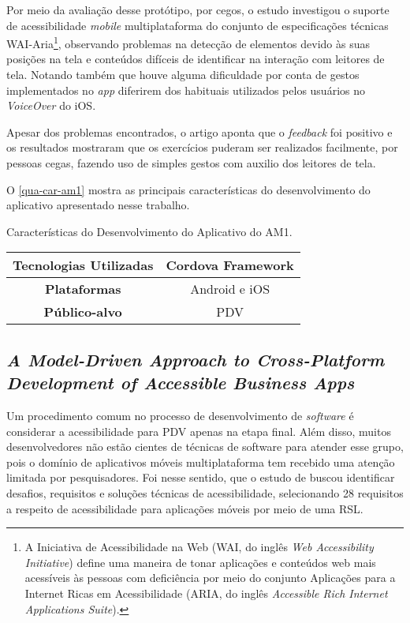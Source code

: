 Por meio da avaliação desse protótipo, por cegos, o estudo investigou o suporte de acessibilidade \emph{mobile} multiplataforma do conjunto de especificações
técnicas WAI-Aria\footnote{A Iniciativa de Acessibilidade na Web (WAI, do inglês \emph{Web Accessibility Initiative})
  define uma maneira de tonar aplicações e conteúdos web mais acessíveis às pessoas com deficiência por meio do conjunto
  Aplicações para a Internet Ricas em Acessibilidade (ARIA, do inglês \emph{Accessible Rich Internet Applications Suite}).},
observando problemas na detecção de elementos devido às suas posições na tela e conteúdos difíceis
de identificar na interação com leitores de tela. Notando também que houve alguma dificuldade por
conta de gestos implementados no \emph{app} diferirem dos habituais utilizados pelos usuários no \emph{VoiceOver} do iOS.

Apesar dos problemas encontrados, o artigo aponta que o \emph{feedback} foi positivo e os resultados mostraram que os exercícios puderam ser realizados facilmente, por pessoas cegas,
fazendo uso de simples gestos com auxilio dos leitores de tela.

O \autoref{qua-car-am1} mostra as principais características do desenvolvimento do aplicativo apresentado nesse trabalho.

\begin{quadro}[htb!]
  \caption{\label{qua-car-am1}Características do Desenvolvimento do Aplicativo do AM1.}
  \begin{tabular}{|c|c|}
    \hline
    \textbf{Tecnologias Utilizadas} & Cordova Framework \\ \hline
    \textbf{Plataformas}            & Android e iOS     \\ \hline
    \textbf{Público-alvo}           & PDV               \\
    \hline
  \end{tabular}
\end{quadro}

\subsection{\emph{A Model-Driven Approach to Cross-Platform Development of Accessible Business Apps}}

Um procedimento comum no processo de desenvolvimento de \emph{software} é considerar a acessibilidade para PDV apenas na etapa final.
Além disso, muitos desenvolvedores não estão cientes de técnicas de software para atender esse grupo, pois o domínio de aplicativos
móveis multiplataforma tem recebido uma atenção limitada por pesquisadores. Foi nesse sentido, que o estudo de 
buscou identificar desafios, requisitos e soluções técnicas de acessibilidade, selecionando 28 requisitos a respeito de acessibilidade para
aplicações móveis por meio de uma RSL\@.

